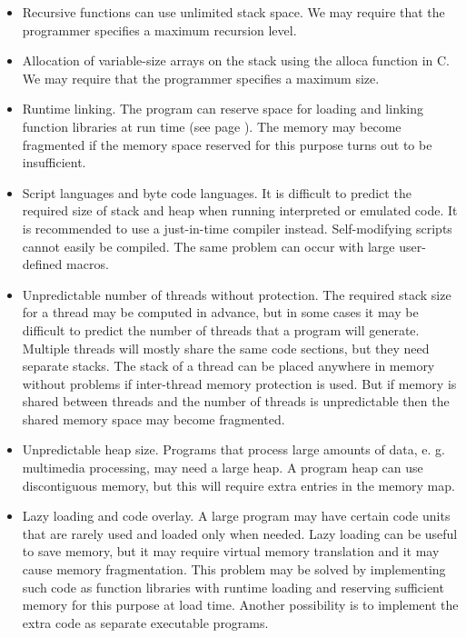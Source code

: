 \documentclass[forwardcom.tex]{subfiles}
\begin{document}
\begin{itemize}
\item Recursive functions can use unlimited stack space. We may require that the programmer specifies a maximum recursion level.

\item Allocation of variable-size arrays on the stack using the alloca function in C. We may require that the programmer specifies a maximum size. 

\item Runtime linking. The program can reserve space for loading and linking function libraries at run time (see page \pageref{runtimeLinking}). The memory may become fragmented if the memory space reserved for this purpose turns out to be insufficient.

\item Script languages and byte code languages. It is difficult to predict the required size of stack and heap when running interpreted or emulated code. It is recommended to use a just-in-time compiler instead. Self-modifying scripts cannot easily be compiled. The same problem can occur with large user-defined macros.

\item Unpredictable number of threads without protection. The required stack size for a thread may be computed in advance, but in some cases it may be difficult to predict the number of threads that a program will generate. Multiple threads will mostly share the same code sections, but they need separate stacks. The stack of a thread can be placed anywhere in memory without problems if inter-thread memory protection is used. But if memory is shared between threads and the number of threads is unpredictable then the shared 
memory space may become fragmented. 

\item Unpredictable heap size. Programs that process large amounts of data, e. g. multimedia processing, may need a large heap. A program heap can use discontiguous memory, but this will require extra entries in the memory map. 

\item Lazy loading and code overlay. A large program may have certain code units that are rarely used and loaded only when needed. Lazy loading can be useful to save memory, but it may require virtual memory translation and it may cause memory fragmentation. This problem may be solved by implementing such code as function libraries with runtime loading and reserving sufficient memory for this purpose at load time. Another possibility is to implement the extra code as separate executable programs. 


\end{itemize}
\end{document}
